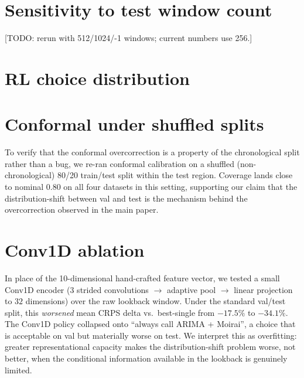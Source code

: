 \documentclass{article}
\begin{document}
\section{Sensitivity to test window count}
\label{app:windows}

[TODO: rerun with 512/1024/-1 windows; current numbers use 256.]

\section{RL choice distribution}
\label{app:choices}


\section{Conformal under shuffled splits}
\label{app:shuffled}

To verify that the conformal overcorrection is a property of the
chronological split rather than a bug, we re-ran conformal calibration
on a shuffled (non-chronological) 80/20 train/test split within the
test region. Coverage lands close to nominal $0.80$ on all four
datasets in this setting, supporting our claim that the
distribution-shift between val and test is the mechanism behind the
overcorrection observed in the main paper.

\section{Conv1D ablation}
\label{app:conv1d}

In place of the 10-dimensional hand-crafted feature vector, we tested
a small Conv1D encoder (3 strided convolutions $\to$ adaptive pool $\to$
linear projection to $32$ dimensions) over the raw lookback window.
Under the standard val/test split, this \emph{worsened} mean CRPS
delta vs.\ best-single from $-17.5\%$ to $-34.1\%$. The Conv1D policy
collapsed onto ``always call ARIMA + Moirai'', a choice that is
acceptable on val but materially worse on test. We interpret this as
overfitting: greater representational capacity makes the
distribution-shift problem worse, not better, when the conditional
information available in the lookback is genuinely limited.
\end{document}
